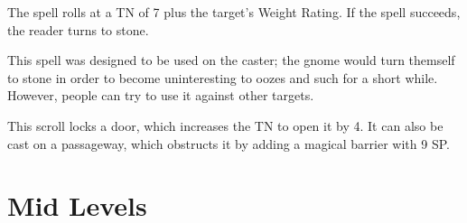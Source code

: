 \begin{multicols}{2}
\begin{itemize}
\end{itemize}

The spell rolls at a TN of 7 plus the target's Weight Rating.
If the spell succeeds, the reader turns to stone.

This spell was designed to be used on the caster; the gnome would turn themself to stone in order to become uninteresting to oozes and such for a short while.
However, people can try to use it against other targets.


This scroll locks a door, which increases the TN to open it by 4.
It can also be cast on a passageway, which obstructs it by adding a magical barrier with 9 SP.

\end{multicols}

\section{Mid Levels}

